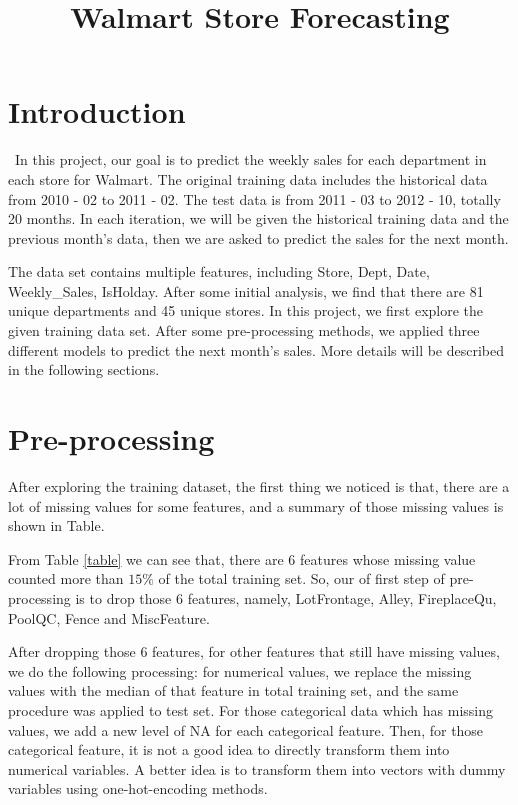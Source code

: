 \documentclass[12pt]{article}
\title{Walmart Store Forecasting}
\begin{document}
%
\maketitle

\section{Introduction}
\quad\ In this project, our goal is to predict the weekly sales for each department in each store for Walmart. The original training data includes the historical data from 2010 - 02 to 2011 - 02.  The test data is from 2011 - 03 to 2012 - 10, totally 20 months. In each iteration, we will be given the historical training data and the previous month's data, then we are asked to predict the sales for the next month.

The data set contains multiple features, including Store, Dept, Date, Weekly\_Sales, IsHolday. After some initial analysis, we find that there are 81 unique departments and 45 unique stores. In this project, we first explore the given training data set. After some pre-processing methods, we applied three different models to predict the next month's sales. More details will be described in the following sections.

\section{Pre-processing}
After exploring the training dataset, the first thing we noticed is that, there are a lot of missing values for some features, and a summary of those missing values is shown in Table.

From Table \ref{table} we can see that, there are 6 features whose missing value counted more than $15\%$ of the total training set. So, our of first step of pre-processing is to drop those 6 features, namely, LotFrontage, Alley, FireplaceQu, PoolQC, Fence and MiscFeature. 

After dropping those 6 features, for other features that still have missing values, we do the following processing: for numerical values, we replace the missing values with the median of that feature in total training set, and the same procedure was applied to test set. For those categorical data which has missing values, we add a new level of NA for each categorical feature. Then, for those categorical feature, it is not a good idea to directly transform them into numerical variables. A better idea is to transform them into vectors with dummy variables using one-hot-encoding methods. 
\end{document}
